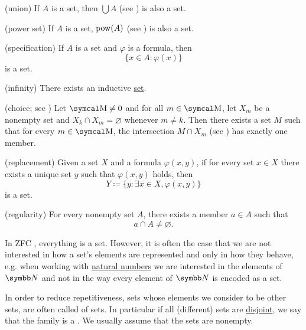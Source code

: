 \begin{definition}
\begin{DefEnum}
    (union) If \( A \) is a set, then \( \bigcup A \) (see ) is also a set.

    (power set) If \( A \) is a set, \( \operatorname{pow}(A) \) (see ) is also a set.

    (specification) If \( A \) is a set and \( \varphi \) is a formula, then
    \begin{equation*}
      \{ x \in A \colon \varphi(x) \}
    \end{equation*}
    is a set.

    (infinity) There exists an inductive \hyperref[def:inductive_set]{set}.

    (choice; see ) Let \( \CM \neq 0 \) and for all \( m \in \CM \), let \( X_m \) be a nonempty set and \( X_k \cap X_m = \varnothing \) whenever \( m \neq k \). Then there exists a set \( M \) such that for every \( m \in \CM \), the intersection \( M \cap X_m \) (see ) has exactly one member.

    (replacement) Given a set \( X \) and a formula \( \varphi(x, y) \), if for every set \( x \in X \) there exists a unique set \( y \) such that \( \varphi(x, y) \) holds, then
    \begin{equation*}
      Y \coloneqq \{ y \colon \exists x \in X, \varphi(x, y) \}
    \end{equation*}
    is a set.

    (regularity) For every nonempty set \( A \), there exists a member \( a \in A \) such that
    \begin{equation*}
      a \cap A \neq \varnothing.
    \end{equation*}
  \end{DefEnum}
\end{definition}

\begin{remark}\label{remark:family_of_sets}
  In ZFC , everything is a set. However, it is often the case that we are not interested in how a set's elements are represented and only in how they behave, e.g. when working with \hyperref[def:natural_numbers]{natural numbers} we are interested in the elements of \( \BN \) and not in the way every element of \( \BN \) is encoded as a set.

  In order to reduce repetitiveness, sets whose elements we consider to be other sets, are often called  of sets. In particular if all (different) sets are \hyperref[def:set_intersection]{disjoint}, we say that the family is a . We usually assume that the sets are nonempty.
\end{remark}

